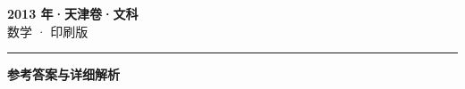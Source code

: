 \documentclass[zihao=5, a4paper]{ctexart}
\begin{document}
\begin{center}
  {\Large\bfseries 2013 年·天津卷·文科}\\[4pt]
  {\large 数学 · 印刷版}
\end{center}
\medskip
{}

\par\bigskip\hrule\bigskip
{}
\Needspace{0.55\textheight}
\begin{center}{\large\bfseries 参考答案与详细解析}\end{center}
\smallskip

\end{document}
